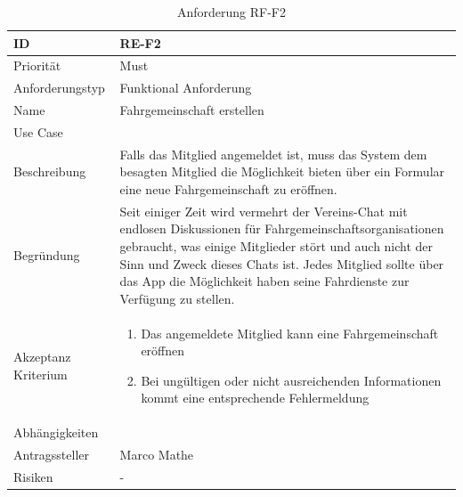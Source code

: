 \begin{table}[ht]
\centering
  \begin{tabular}{ l | p{8cm} }
	\hline
	\rowcolor{gray}
	ID 			&	\textbf{RE-F2}\\ \hline
	Priorität 		&	Must\\ \hline
	Anforderungstyp	&	Funktional Anforderung\\ \hline
	Name 			&	Fahrgemeinschaft erstellen\\ \hline
	Use Case 		&	\nameref{table:use_case_1}\\ \hline
	Beschreibung 	&	Falls das Mitglied angemeldet ist, muss das System dem besagten Mitglied die Möglichkeit bieten über ein Formular eine neue Fahrgemeinschaft zu eröffnen.\\ \hline
	Begründung 		&	Seit einiger Zeit wird vermehrt der Vereins-Chat mit endlosen Diskussionen für Fahrgemeinschaftsorganisationen gebraucht, was einige Mitglieder stört und auch nicht der Sinn und Zweck dieses Chats ist. Jedes Mitglied sollte über das App die Möglichkeit haben seine Fahrdienste zur Verfügung zu stellen.\\ \hline
	Akzeptanz Kriterium	&	\begin{enumerate}
					\item Das angemeldete Mitglied kann eine Fahrgemeinschaft eröffnen
					\item Bei ungültigen oder nicht ausreichenden Informationen kommt eine entsprechende Fehlermeldung
					\end{enumerate}
					\\ \hline
	Abhängigkeiten 	&	\nameref{table:req_1}\\ \hline
	Antragssteller 	&	Marco Mathe\\ \hline
	Risiken	 	&	-
  \end{tabular}
   \caption{Anforderung RF-F2}\label{table:req_2}
\end{table}

